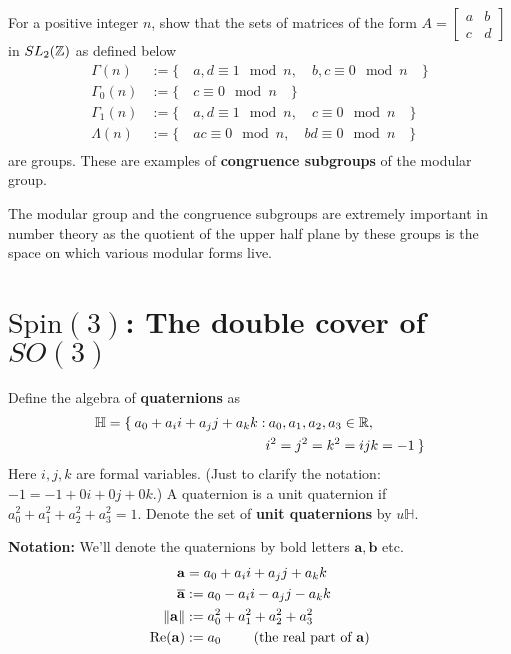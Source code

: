 \begin{question}
	For a positive integer $n$, show that the sets of matrices of the form $A = \begin{bmatrix}a & b \\ c & d\end{bmatrix}$ in $SL_2(\mathbb{Z})$ as defined below
	\begin{align*}
		\Gamma(n) &:= \{ \quad a,d \equiv 1 \mod n, \quad b,c \equiv 0 \mod n \quad \} \\
		\Gamma_0(n) &:= \{ \quad  c \equiv 0 \mod n  \quad \} \\
		\Gamma_1(n) &:= \{ \quad  a,d \equiv 1 \mod n, \quad c \equiv 0 \mod n  \quad \} \\
		\Lambda(n) &:= \{ \quad  ac \equiv 0 \mod n, \quad bd \equiv 0 \mod n  \quad \} \\
		\end{align*}
		are groups. These are examples of \textbf{congruence subgroups} of the modular group.
\end{question}

The modular group and the congruence subgroups are extremely important in number theory as the quotient of the upper half plane by these groups is the space on which various modular forms live.



\newpage
\section{$\mathrm{Spin}(3)$: The double cover of $SO(3)$}
\begin{definition}
	Define the algebra of \textbf{quaternions} as
	\begin{align*}
		\mathbb{H} = \{ \: a_0 + a_i i + a_j j + a_k k :& \: a_0, a_1, a_2, a_3 \in \mathbb{R}, \\
		&i^2 = j^2 = k^2 = ijk = -1 \: \}
	\end{align*}
	Here $i,j,k$ are formal variables. (Just to clarify the notation: $-1 = -1 + 0i + 0j + 0k$.)
	A quaternion is a unit quaternion if $a_0^2 + a_1^2 + a_2^2 + a_3^2 = 1$. Denote the set of \textbf{unit quaternions} by $u \mathbb{H}$.
\end{definition}
\textbf{Notation: } We'll denote the quaternions by bold letters $\mathbf{a}, \mathbf{b}$ etc. \begin{align*}
	\mathbf{a} &= a_0 + a_i i + a_j j + a_k k \\
	\overline{\mathbf{a}} &:= a_0 - a_i i - a_j j - a_k k\\
	\lVert \mathbf{a} \rVert &:= a_0^2 + a_1^2 + a_2^2 + a_3^2\\
	\mathrm{Re}(\mathbf{a}) &:= a_0 \qquad\mbox{ (the real part of $\mathbf{a}$)}
\end{align*}

